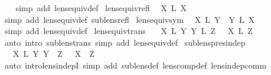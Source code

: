 \begin{isabellebody}
\ \ %
\endisadelimproof
%
\isatagproof
{}\isamarkupfalse%
\ {\isacharparenleft}simp\ add{\isacharcolon}\ lens{\isacharunderscore}equiv{\isacharunderscore}def{\isacharparenright}%
\endisatagproof
{\isafoldproof}%
%
\isadelimproof
\isanewline
%
\endisadelimproof
\isanewline
{}\isamarkupfalse%
\ lens{\isacharunderscore}equiv{\isacharunderscore}refl{\isacharcolon}\isanewline
\ \ {\isachardoublequoteopen}X\ {\isasymapprox}\isactrlsub L\ X{\isachardoublequoteclose}\isanewline
%
\isadelimproof
\ \ %
\endisadelimproof
%
\isatagproof
{}\isamarkupfalse%
\ {\isacharparenleft}simp\ add{\isacharcolon}\ lens{\isacharunderscore}equiv{\isacharunderscore}def\ sublens{\isacharunderscore}refl{\isacharparenright}%
\endisatagproof
{\isafoldproof}%
%
\isadelimproof
\isanewline
%
\endisadelimproof
\isanewline
{}\isamarkupfalse%
\ lens{\isacharunderscore}equiv{\isacharunderscore}sym{\isacharcolon}\isanewline
\ \ {\isachardoublequoteopen}X\ {\isasymapprox}\isactrlsub L\ Y\ {\isasymLongrightarrow}\ Y\ {\isasymapprox}\isactrlsub L\ X{\isachardoublequoteclose}\isanewline
%
\isadelimproof
\ \ %
\endisadelimproof
%
\isatagproof
{}\isamarkupfalse%
\ {\isacharparenleft}simp\ add{\isacharcolon}\ lens{\isacharunderscore}equiv{\isacharunderscore}def{\isacharparenright}%
\endisatagproof
{\isafoldproof}%
%
\isadelimproof
\isanewline
%
\endisadelimproof
\isanewline
{}\isamarkupfalse%
\ lens{\isacharunderscore}equiv{\isacharunderscore}trans{\isacharcolon}\isanewline
\ \ {\isachardoublequoteopen}{\isasymlbrakk}\ X\ {\isasymapprox}\isactrlsub L\ Y{\isacharsemicolon}\ Y\ {\isasymapprox}\isactrlsub L\ Z\ {\isasymrbrakk}\ {\isasymLongrightarrow}\ X\ {\isasymapprox}\isactrlsub L\ Z{\isachardoublequoteclose}\isanewline
%
\isadelimproof
\ \ %
\endisadelimproof
%
\isatagproof
{}\isamarkupfalse%
\ {\isacharparenleft}auto\ intro{\isacharcolon}\ sublens{\isacharunderscore}trans\ simp\ add{\isacharcolon}\ lens{\isacharunderscore}equiv{\isacharunderscore}def{\isacharparenright}%
\endisatagproof
{\isafoldproof}%
%
\isadelimproof
\isanewline
%
\endisadelimproof
\isanewline
{}\isamarkupfalse%
\ sublens{\isacharunderscore}pres{\isacharunderscore}indep{\isacharcolon}\isanewline
\ \ {\isachardoublequoteopen}{\isasymlbrakk}\ X\ {\isasymsubseteq}\isactrlsub L\ Y{\isacharsemicolon}\ Y\ {\isasymbowtie}\ Z\ {\isasymrbrakk}\ {\isasymLongrightarrow}\ X\ {\isasymbowtie}\ Z{\isachardoublequoteclose}\isanewline
%
\isadelimproof
\ \ %
\endisadelimproof
%
\isatagproof
{}\isamarkupfalse%
\ {\isacharparenleft}auto\ intro{\isacharbang}{\isacharcolon}lens{\isacharunderscore}indepI\ simp\ add{\isacharcolon}\ sublens{\isacharunderscore}def\ lens{\isacharunderscore}comp{\isacharunderscore}def\ lens{\isacharunderscore}indep{\isacharunderscore}comm{\isacharparenright}\isanewline

\end{isabellebody}
